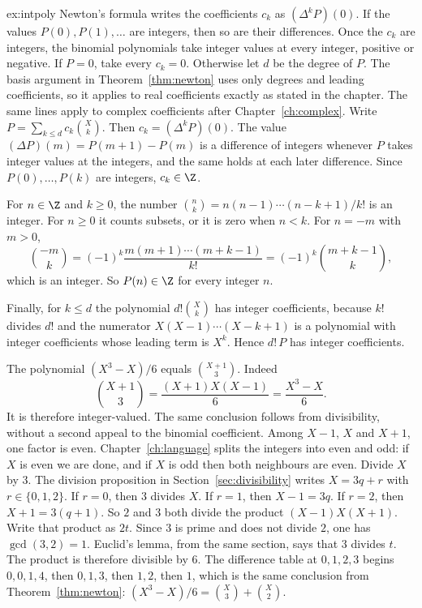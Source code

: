 \begin{solution}{ex:intpoly}
\idea Newton's formula writes the coefficients $c_k$ as $(\Delta^k P)(0)$. If the values $P(0),P(1),\dots$ are integers, then so are their differences. Once the $c_k$ are integers, the binomial polynomials take integer values at every integer, positive or negative.
\writeup If $P=0$, take every $c_k=0$. Otherwise let $d$ be the degree of $P$. The basis argument in Theorem~\ref{thm:newton} uses only degrees and leading coefficients, so it applies to real coefficients exactly as stated in the chapter. The same lines apply to complex coefficients after Chapter~\ref{ch:complex}. Write $P=\sum_{k\le d}c_k\binom Xk$. Then $c_k=(\Delta^k P)(0)$. The value $(\Delta P)(m)=P(m+1)-P(m)$ is a difference of integers whenever $P$ takes integer values at the integers, and the same holds at each later difference. Since $P(0),\dots,P(k)$ are integers, $c_k\in\Z$.

For $n\in\Z$ and $k\ge0$, the number $\binom nk=n(n-1)\cdots(n-k+1)/k!$ is an integer. For $n\ge0$ it counts subsets, or it is zero when $n<k$. For $n=-m$ with $m>0$,
\[
\binom{-m}{k}=(-1)^k\frac{m(m+1)\cdots(m+k-1)}{k!}=(-1)^k\binom{m+k-1}{k},
\]
which is an integer. So $P(n)\in\Z$ for every integer $n$.

Finally, for $k\le d$ the polynomial $d!\binom Xk$ has integer coefficients, because $k!$ divides $d!$ and the numerator $X(X-1)\cdots(X-k+1)$ is a polynomial with integer coefficients whose leading term is $X^k$. Hence $d!\,P$ has integer coefficients.

The polynomial $(X^3-X)/6$ equals $\binom{X+1}{3}$. Indeed
\[
\binom{X+1}{3}=\frac{(X+1)X(X-1)}{6}=\frac{X^3-X}{6}.
\]
It is therefore integer-valued. The same conclusion follows from divisibility, without a second appeal to the binomial coefficient. Among $X-1$, $X$ and $X+1$, one factor is even. Chapter~\ref{ch:language} splits the integers into even and odd: if $X$ is even we are done, and if $X$ is odd then both neighbours are even. Divide $X$ by $3$. The division proposition in Section~\ref{sec:divisibility} writes $X=3q+r$ with $r\in\{0,1,2\}$. If $r=0$, then $3$ divides $X$. If $r=1$, then $X-1=3q$. If $r=2$, then $X+1=3(q+1)$. So $2$ and $3$ both divide the product $(X-1)X(X+1)$. Write that product as $2t$. Since $3$ is prime and does not divide $2$, one has $\gcd(3,2)=1$. Euclid's lemma, from the same section, says that $3$ divides $t$. The product is therefore divisible by $6$. The difference table at $0,1,2,3$ begins $0,0,1,4$, then $0,1,3$, then $1,2$, then $1$, which is the same conclusion from Theorem~\ref{thm:newton}: $(X^3-X)/6=\binom X3+\binom X2$.
\end{solution}

